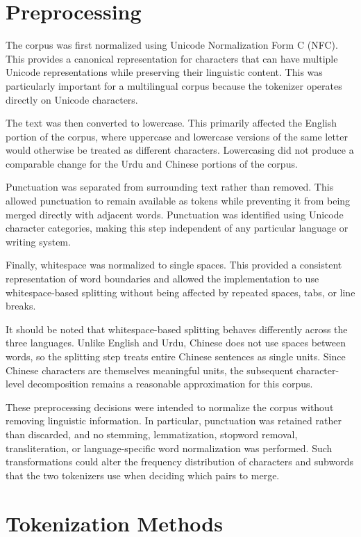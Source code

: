 \documentclass[sigconf]{acmart}
\begin{document}
\section{Preprocessing}

The corpus was first normalized using Unicode Normalization Form C
(NFC). This provides a canonical representation for characters that can
have multiple Unicode representations while preserving their linguistic
content. This was particularly important for a multilingual corpus
because the tokenizer operates directly on Unicode characters.

The text was then converted to lowercase. This primarily affected the
English portion of the corpus, where uppercase and lowercase versions
of the same letter would otherwise be treated as different characters.
Lowercasing did not produce a comparable change for the Urdu and
Chinese portions of the corpus.

Punctuation was separated from surrounding text rather than removed.
This allowed punctuation to remain available as tokens while preventing
it from being merged directly with adjacent words. Punctuation was
identified using Unicode character categories, making this step
independent of any particular language or writing system.

Finally, whitespace was normalized to single spaces. This provided a
consistent representation of word boundaries and allowed the
implementation to use whitespace-based splitting without being affected
by repeated spaces, tabs, or line breaks.

It should be noted that whitespace-based splitting behaves 
differently across the three languages. Unlike English and Urdu, 
Chinese does not use spaces between words, so the splitting step 
treats entire Chinese sentences as single units. Since Chinese 
characters are themselves meaningful units, the subsequent 
character-level decomposition remains a reasonable approximation 
for this corpus.

These preprocessing decisions were intended to normalize the corpus
without removing linguistic information. In particular, punctuation was
retained rather than discarded, and no stemming, lemmatization,
stopword removal, transliteration, or language-specific word
normalization was performed. Such transformations could alter the
frequency distribution of characters and subwords that the two
tokenizers use when deciding which pairs to merge.

\section{Tokenization Methods}
\end{document}
